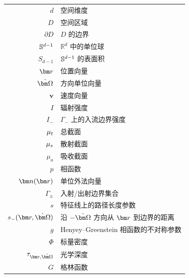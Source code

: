 \begin{nomenclature}
    \label{chap:symb}

    \begin{longtable}{rl}
        $d$                      & 空间维度                          \\
        $D$                      & 空间区域                          \\
        $\partial D$             & $D$ 的边界                       \\
        $\mathbb{S}^{d-1}$              & $\mathbb{R}^d$ 中的单位球          \\
        $S_{d-1}$                & $\mathbb{S}^{d-1}$ 的表面积              \\
        $\br$                    & 位置向量                          \\
        $\bOmega$                & 方向单位向量                        \\
        $\bm{v}$                 & 速度向量                          \\
        $I$                      & 辐射强度                          \\
        $I_{-}$                  & $\Gamma_{-}$ 上的入流边界强度         \\
        $\mu_t$                   & 总截面                           \\
        $\mu_s$                   & 散射截面                          \\
        $\mu_a$                  & 吸收截面                          \\
        $p$                      & 相函数                           \\
        $\bn(\br)$               & 单位外法向量                        \\
        $\Gamma_{\pm}$           & 入射/出射边界集合                     \\
        $s$                      & 特征线上的路径长度参数                   \\
        $s_{-}(\br,\bOmega)$     & 沿 $-\bOmega$ 方向从 $\br$ 到边界的距离 \\
        $g$                      & Henyey--Greenstein 相函数的不对称参数  \\
        $\Phi$                   & 标量密度                          \\
        $\tau_{\br,\bOmega}$     & 光学深度                          \\
        $G$                      & 格林函数                          \\

\end{longtable}
\end{nomenclature}
